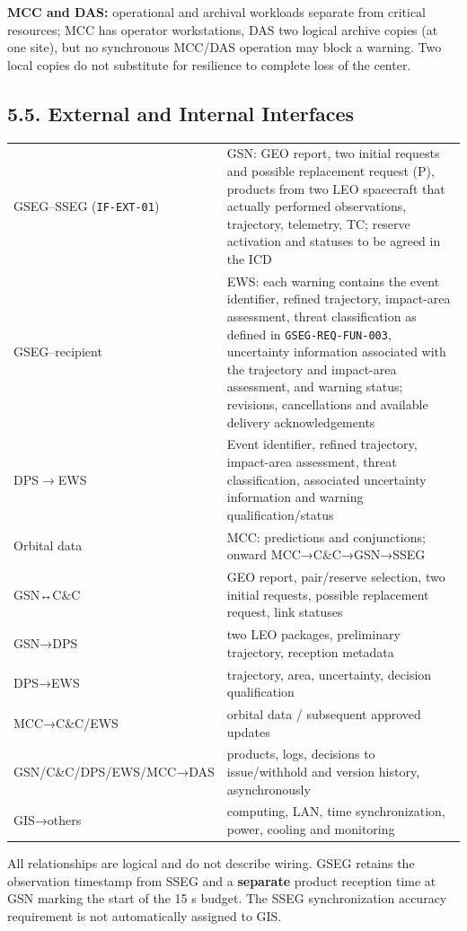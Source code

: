 \textbf{MCC and DAS:} operational and archival workloads separate from critical resources; MCC has operator workstations, DAS two logical archive copies (at one site), but no synchronous MCC/\allowbreak{}DAS operation may block a warning. Two local copies do not substitute for resilience to complete loss of the center.

\subsection{5.5. External and Internal Interfaces}\label{interfaces}\label{external-interfaces}\label{internal-interfaces}

\begingroup{}
\begin{longtable}{|P{0.28}|P{0.72}|}
\hline{}
 & \\ \hline
\endhead
\hline\endlastfoot
GSEG–SSEG (\texttt{IF-\allowbreak{}EXT-\allowbreak{}01}) & GSN: GEO report, two initial requests and possible replacement request (P), products from two LEO spacecraft that actually performed observations, trajectory, telemetry, TC; reserve activation and statuses to be agreed in the ICD\\ \hline
GSEG--recipient & EWS: each warning contains the event identifier, refined trajectory, impact-area assessment, threat classification as defined in \texttt{GSEG-REQ-FUN-003}, uncertainty information associated with the trajectory and impact-area assessment, and warning status; revisions, cancellations and available delivery acknowledgements\\ \hline
DPS$\rightarrow$EWS & Event identifier, refined trajectory, impact-area assessment, threat classification, associated uncertainty information and warning qualification/status\\ \hline
Orbital data & MCC: predictions and conjunctions; onward MCC→C\&C→GSN→SSEG\\ \hline
GSN↔C\&C & GEO report, pair/\allowbreak{}reserve selection, two initial requests, possible replacement request, link statuses\\ \hline
GSN→DPS & two LEO packages, preliminary trajectory, reception metadata\\ \hline
DPS→EWS & trajectory, area, uncertainty, decision qualification\\ \hline
MCC→C\&C/\allowbreak{}EWS & orbital data /\allowbreak{} subsequent approved updates\\ \hline
GSN/\allowbreak{}C\&C/\allowbreak{}DPS/\allowbreak{}EWS/\allowbreak{}MCC→DAS & products, logs, decisions to issue/\allowbreak{}withhold and version history, asynchronously\\ \hline
GIS→others & computing, LAN, time synchronization, power, cooling and monitoring\\*
\end{longtable}
\endgroup

All relationships are logical and do not describe wiring. GSEG retains the observation timestamp from SSEG and a \textbf{separate} product reception time at GSN marking the start of the 15 s budget. The SSEG synchronization accuracy requirement is not automatically assigned to GIS.
